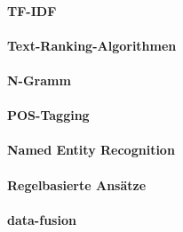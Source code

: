 \paragraph{TF-IDF}

\paragraph{Text-Ranking-Algorithmen}

\paragraph{N-Gramm}

\paragraph{POS-Tagging}

\paragraph{Named Entity Recognition}

\paragraph{Regelbasierte Ansätze}

\paragraph{data-fusion}